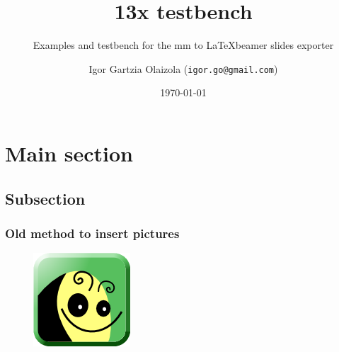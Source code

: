 \documentclass[usepdftitle=false,professionalfonts,compress ]{beamer}
\title{13x testbench}
\subtitle{Examples and testbench for the mm to \LaTeX beamer slides exporter}
\author{Igor Gartzia Olaizola (\texttt{igor.go@gmail.com})}
\institute{Freeplane}
\date{\today}
\begin{document}
\frame[plain]{
	\frametitle{}
	\titlepage
	\vspace{-0.5cm}
	\begin{center}
	\end{center}
}
\frame{
	\tableofcontents[hideallsubsections]
}












    
























































\section{Main section}
		
\subsection{Subsection}

{
\begin{frame}\frametitle{Old method to insert pictures}

\begin{figure}
	\includegraphics[height=0.8\textheight]{freeplane-logo-2014.png}\end{figure}
\end{frame}
}
\end{document}
